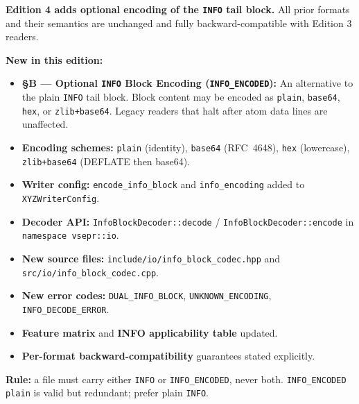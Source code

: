 \documentclass[12pt, a4paper, oneside]{article}
\newcommand{\file}[1]{\texttt{#1}}
\newcommand{\type}[1]{\texttt{#1}}
\begin{document}
\begin{tcolorbox}[
  enhanced, breakable=false,
  colback=enc4greenlight, colframe=enc4green,
  boxrule=1.2pt, arc=4pt,
  title={\large\bfseries\color{white} What Is New in Edition 4 --- v4.2.0},
  attach boxed title to top left={yshift=-2mm, xshift=6mm},
  boxed title style={colback=enc4green, colframe=enc4green, arc=3pt},
  fonttitle=\bfseries, left=6pt, right=6pt, top=8pt, bottom=6pt
]

\textbf{Edition 4 adds optional encoding of the \texttt{INFO} tail block.}
All prior formats and their semantics are unchanged and fully backward-compatible
with Edition 3 readers.

\medskip
\begin{tcolorbox}[
  colback=white, colframe=rulegray,
  boxrule=0.6pt, arc=2pt, left=4pt, right=4pt, top=4pt, bottom=4pt
]
\textbf{New in this edition:}
\begin{itemize}
  \item \textbf{\S{}B --- Optional \texttt{INFO} Block Encoding (\texttt{INFO\_ENCODED}):}
        An alternative to the plain \texttt{INFO} tail block.  Block content may be
        encoded as \texttt{plain}, \texttt{base64}, \texttt{hex}, or \texttt{zlib+base64}.
        Legacy readers that halt after atom data lines are unaffected.
  \item \textbf{Encoding schemes:} \texttt{plain} (identity), \texttt{base64} (RFC~4648),
        \texttt{hex} (lowercase), \texttt{zlib+base64} (DEFLATE then base64).
  \item \textbf{Writer config:} \texttt{encode\_info\_block} and \texttt{info\_encoding}
        added to \type{XYZWriterConfig}.
  \item \textbf{Decoder API:} \type{InfoBlockDecoder::decode} /
        \type{InfoBlockDecoder::encode} in \texttt{namespace vsepr::io}.
  \item \textbf{New source files:} \file{include/io/info\_block\_codec.hpp} and
        \file{src/io/info\_block\_codec.cpp}.
  \item \textbf{New error codes:} \type{DUAL\_INFO\_BLOCK}, \type{UNKNOWN\_ENCODING},
        \type{INFO\_DECODE\_ERROR}.
  \item \textbf{Feature matrix} and \textbf{INFO applicability table} updated.
  \item \textbf{Per-format backward-compatibility} guarantees stated explicitly.
\end{itemize}
\end{tcolorbox}

\medskip
\begin{tcolorbox}[
  colback=warnredlight, colframe=warnred,
  boxrule=0.6pt, arc=2pt, left=4pt, right=4pt, top=4pt, bottom=4pt
]
\textbf{\color{warnred}Rule:} a file must carry either \texttt{INFO} or
\texttt{INFO\_ENCODED}, never both.  \texttt{INFO\_ENCODED plain} is valid
but redundant; prefer plain \texttt{INFO}.
\end{tcolorbox}

\end{tcolorbox}
\end{document}
